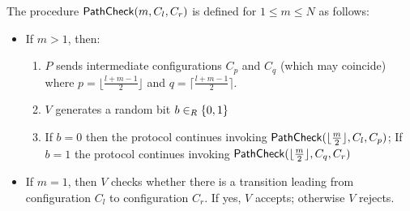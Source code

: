 \medskip
\noindent The procedure $\mathsf{PathCheck}(m, C_l, C_r)$ is defined for $1 \leq m \leq N$ as 
follows:
\begin{framed}
\begin{itemize}
    \item If $m > 1$, then:
    \begin{enumerate}
        \item $P$ sends intermediate configurations $C_{p}$ and $C_q$ (which may coincide) where $p = \lfloor \frac{l+m-1}{2} \rfloor$  and 
        $q = \lceil \frac{l+m-1}{2} \rceil$. %
        \item $V$ generates a random bit $b \in_R \{0, 1\}$
        \item If  $b = 0$ then the protocol continues invoking $\mathsf{PathCheck}(\lfloor \frac{m}{2} \rfloor, C_l, C_p)$; If $b = 1$ the protocol continues invoking $\mathsf{PathCheck}(\lfloor \frac{m}{2} \rfloor, C_q, C_r)$
    \end{enumerate}
    \item If $m = 1$, then $V$ checks whether there is a transition leading from configuration $C_l$ to configuration $C_r$. If yes, $V$ accepts; otherwise $V$ rejects.
\end{itemize}
\end{framed}

\medskip

